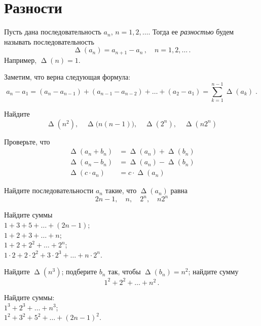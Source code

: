 
\section*{Разности}


\begingroup
    \ifdefined\mathup
        \def\diff{\mathop{\mathup{\Delta}}}%
    \else
        \def\diff{\mathop{\Delta}}%
    \fi

Пусть дана последовательность $a_{n}$, $n = 1, 2, \ldots$.
Тогда ее \emph{разностью} будем называть последовательность
\[
    \diff(a_{n}) = a_{n+1} - a_{n}
\, , \quad n = 1, 2, \ldots
\, . \]
Например, $\diff(n) = 1$.

Заметим, что верна следующая формула:
\begin{equation}\label{eq:diffsum}
    a_{n} - a_{1}
=
    (a_{n} - a_{n-1}) + (a_{n-1} - a_{n-2}) + \ldots + (a_{2} - a_{1})
=
    \sum_{k=1}^{n-1}
        \diff(a_{k})
\; . \end{equation}

\begin{problems}

\item
Найдите
\[
    \diff(n^2)
, \quad
    \diff\bigl( n (n - 1) \bigr)
, \quad
    \diff(2^{n})
, \quad
    \diff(n 2^{n})
\]

\item
Проверьте, что
\begin{align*}
    \diff(a_{n} + b_{n}) &= \diff(a_{n}) + \diff(b_{n})
\\
    \diff(a_{n} - b_{n}) &= \diff(a_{n}) - \diff(b_{n})
\\
    \diff(c \cdot a_{n}) &= c \cdot \diff(a_{n})
\end{align*}

\item
Найдите последовательности $a_{n}$ такие, что $\diff(a_{n})$ равна
\[
    2 n - 1
, \quad
    n
, \quad
    2^{n}
, \quad
    n 2^{n}
\]

\item
Найдите суммы
\\
\subproblem
$1 + 3 + 5 + \ldots + (2 n - 1)$;
\\
\subproblem
$1 + 2 + 3 + \ldots + n$;
\\
\subproblem
$1 + 2 + 2^{2} + \ldots + 2^{n}$;
\\
\subproblem
$1 \cdot 2 + 2 \cdot 2^{2} + 3 \cdot 2^{3} + \ldots + n \cdot 2^{n}$.

\item
Найдите $\diff(n^3)$;
подберите $b_{n}$ так, чтобы $\diff(b_{n}) = n^2$;
найдите сумму
\[
    1^2 + 2^2 + \ldots + n^2
\, . \]

\item
Найдите суммы:
\\
\subproblem $1^3 + 2^3 + \ldots + n^3$;
\\
\subproblem $1^2 + 3^2 + 5^2 + \ldots + (2 n - 1)^2$.

\end{problems}

\endgroup %


